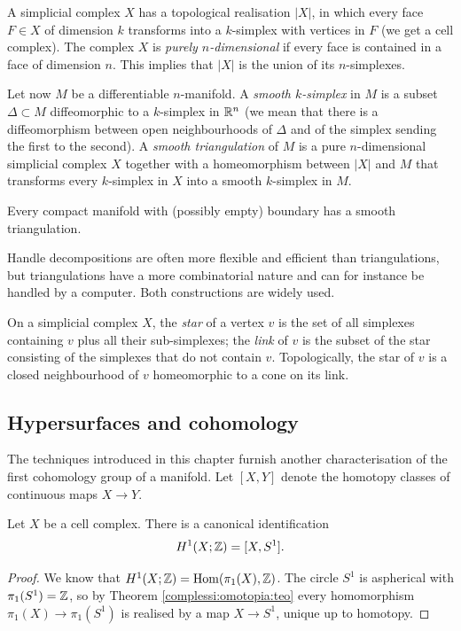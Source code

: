 A simplicial complex $X$ has a topological realisation $|X|$, in which every face $F\in X$ of dimension $k$ transforms into a $k$-simplex with vertices in $F$ (we get a cell complex). The complex $X$ is \emph{purely $n$-dimensional} if every face is contained in a face of dimension $n$. This implies that $|X|$ is the union of its $n$-simplexes.

Let now $M$ be a differentiable $n$-manifold. A \emph{smooth $k$-simplex} in $M$ is a subset $\Delta \subset M$ diffeomorphic to a $k$-simplex in $\mathbb{R}^n$ (we mean that there is a diffeomorphism between open neighbourhoods of $\Delta$ and of the simplex sending the first to the second). A \emph{smooth triangulation} of $M$ is a pure $n$-dimensional simplicial complex $X$ together with a homeomorphism between $|X|$ and $M$ that transforms every $k$-simplex in $X$ into a smooth $k$-simplex in $M$. 

\begin{teo} Every compact manifold with (possibly empty) boundary has a smooth triangulation.
\end{teo}

Handle decompositions are often more flexible and efficient than triangulations, but triangulations have a more combinatorial nature and can for instance be handled by a computer. Both constructions are widely used.

On a simplicial complex $X$, the \emph{star} of a vertex $v$ is the set of all simplexes containing $v$ plus all their sub-simplexes; the \emph{link} of $v$ is the subset of the star consisting of the simplexes that do not contain $v$. Topologically, the star of $v$ is a closed neighbourhood of $v$ homeomorphic to a cone on its link.
 

\subsection{Hypersurfaces and cohomology}
The techniques introduced in this chapter furnish another characterisation of the first cohomology group of a manifold. Let $[X,Y]$ denote the homotopy classes of continuous maps $X \to Y$.

\begin{prop}
Let $X$ be a cell complex. There is a canonical identification
$$H^1(X;\mathbb{Z}) = [X,S^1].$$
\end{prop}
\begin{proof}
We know that $H^1(X;\mathbb{Z}) = {\rm Hom}(\pi_1(X),\mathbb{Z})$.
The circle $S^1$ is aspherical with $\pi_1(S^1)=\mathbb{Z}$, so by Theorem \ref{complessi:omotopia:teo} every homomorphism $\pi_1(X) \to \pi_1(S^1)$ is realised by a map $X\to S^1$, unique up to homotopy.
\end{proof}

